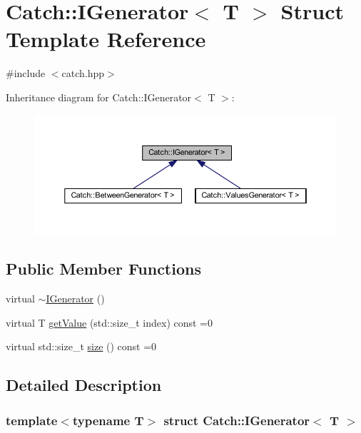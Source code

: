 \hypertarget{struct_catch_1_1_i_generator}{}\section{Catch\+:\+:I\+Generator$<$ T $>$ Struct Template Reference}
\label{struct_catch_1_1_i_generator}


{\ttfamily \#include $<$catch.\+hpp$>$}



Inheritance diagram for Catch\+:\+:I\+Generator$<$ T $>$\+:\nopagebreak
\begin{figure}[H]
\begin{center}
\leavevmode
\includegraphics[width=350pt]{struct_catch_1_1_i_generator__inherit__graph}
\end{center}
\end{figure}
\subsection*{Public Member Functions}
\begin{DoxyCompactItemize}
\item 
virtual \hyperlink{struct_catch_1_1_i_generator_a0622037f4617e09aa8c584b0144d4a1a}{$\sim$\+I\+Generator} ()
\item 
virtual T \hyperlink{struct_catch_1_1_i_generator_ad69e937cb66dba3ed9429c42abf4fce3}{get\+Value} (std\+::size\+\_\+t index) const =0
\item 
virtual std\+::size\+\_\+t \hyperlink{struct_catch_1_1_i_generator_a2e317253b03e838b6065ce69719a198e}{size} () const =0
\end{DoxyCompactItemize}


\subsection{Detailed Description}
\subsubsection*{template$<$typename T$>$\newline
struct Catch\+::\+I\+Generator$<$ T $>$}



